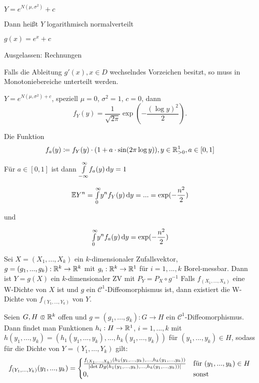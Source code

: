 \documentclass{cheat-sheet}
\newcommand{\E}{\mathbb{E}} %
\begin{document}
\begin{bsp}
  $Y = e^{N (\mu, \sigma^2)} + c$

  Dann heißt $Y$ logarithmisch normalverteilt

  $g(x) = e^x + c$

  Ausgelassen: Rechnungen
\end{bsp}



\begin{bem}
  Falls die Ableitung $g'(x), x \in D$ wechselndes Vorzeichen besitzt, so muss in Monotoniebereiche unterteilt werden.
\end{bem}

\begin{bsp}
  $Y = e^{N(\mu, \sigma^2) + c}$, speziell $\mu = 0$, $\sigma^2 = 1$, $c = 0$, dann
  \[ f_Y(y) = \frac{1}{\sqrt{2 \pi}} \exp(- \frac{(\log y)^2}{2}). \]
\end{bsp}


Die Funktion
\[ f_a(y) \coloneqq f_Y(y) \cdot (1 + a \cdot \sin(2 \pi \log y)), y \in \mathbb{R}_{>0}^1, a \in [0,1] \]

Für $a \in [0,1]$ ist dann ${\textstyle \int\limits_{-\infty}^{\infty}} f_a(y) \,\mathrm{d} y = 1$

\[ \E Y^n = \Int{0}{\infty}{y^n f_Y(y)}{y} = ... = \exp(- \frac{n^2}{2}) \]

und

\[ {\textstyle \int\limits_{0}^{\infty}} y^n f_a(y) \,\mathrm{d} y = \exp(- \frac{n^2}{2}) \]



Sei $X = (X_1, ..., X_k)$ ein $k$-dimensionaler Zufallsvektor,
$g = (g_1, ..., g_k) : \mathbb{R}^k \to \mathbb{R}^k$ mit $g_i : \mathbb{R}^k \to \mathbb{R}^1$ für $i = 1, ..., k$ Borel-messbar.
Dann ist $Y = g(X)$ ein $k$-dimensionaler ZV mit $P_Y = P_X \circ g^{-1}$
Falls $f_{(X_1, ..., X_k)}$ eine W-Dichte von $X$ ist und $g$ ein $\mathcal{C}^1$-Diffeomorphismus ist, dann existiert die W-Dichte von $f_{(Y_1, ..., Y_k)}$ von $Y$.

\begin{satz}
  Seien $G, H \opn \R^k$ offen und $g = (g_1, ..., g_k) : G \to H$ ein $\mathcal{C}^1$-Diffeomorphismus.
  Dann findet man Funktionen $h_i : H \to \mathbb{R}^1$, $i = 1, ..., k$ mit $h(y_1, ..., y_k) = (h_1(y_1, ..., y_k), ..., h_k(y_1, ..., y_k))$ für $(y_1, ..., y_k) \in H$, sodass für die Dichte von $Y = (Y_1, ..., Y_k)$ gilt:
  \[ f_{(Y_1, ..., Y_k)}(y_1, ..., y_k) = \begin{cases} \frac{f_{(X_1, ..., X_k)}(h_1(y_1, ..., y_k), ..., h_k(y_1, ..., y_k))}{\lvert\det D g(h_1(y_1, ..., y_k), ..., h_k(y_1, ..., y_k))\rvert} & \text{für $(y_1, ..., y_k) \in H$} \\ 0, & \text{sonst} \end{cases} \]
\end{satz}
\end{document}

